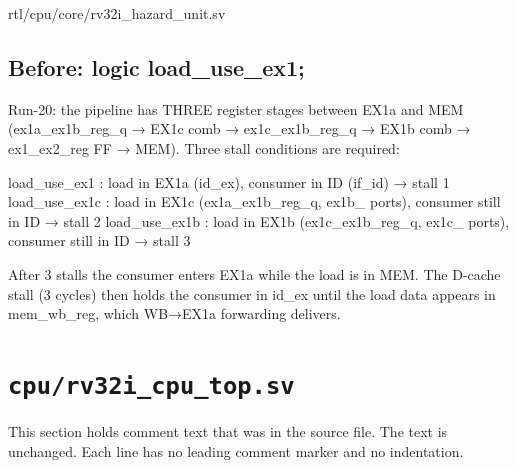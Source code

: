 \begin{relocated}{rtl/cpu/core/rv32i_hazard_unit.sv}

\subsection*{Before: logic load\_use\_ex1;}

\begin{textblock}
Run-20: the pipeline has THREE register stages between EX1a and MEM
(ex1a_ex1b_reg_q → EX1c comb → ex1c_ex1b_reg_q → EX1b comb →
 ex1_ex2_reg FF → MEM).  Three stall conditions are required:

  load_use_ex1   : load in EX1a (id_ex), consumer in ID (if_id)     → stall 1
  load_use_ex1c  : load in EX1c (ex1a_ex1b_reg_q, ex1b_ ports),
                   consumer still in ID                               → stall 2
  load_use_ex1b  : load in EX1b (ex1c_ex1b_reg_q, ex1c_ ports),
                   consumer still in ID                               → stall 3

After 3 stalls the consumer enters EX1a while the load is in MEM.
The D-cache stall (3 cycles) then holds the consumer in id_ex until
the load data appears in mem_wb_reg, which WB→EX1a forwarding delivers.
\end{textblock}

\end{relocated}

\section{\texttt{cpu/rv32i\_cpu\_top.sv}}\label{tm:mod:rv32i-cpu-top}

This section holds comment text that was in the source file. The text is unchanged. Each line has no leading comment marker and no indentation.

